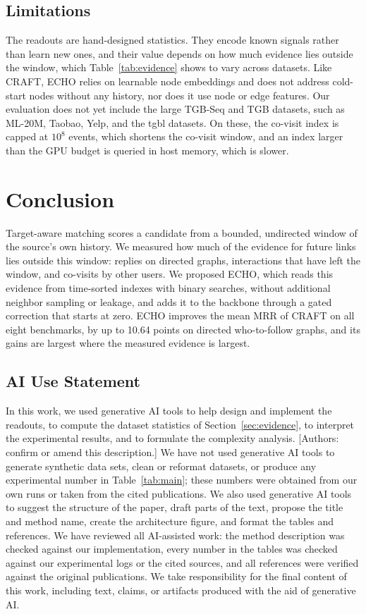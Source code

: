 \documentclass[twoside]{article}
\newcommand{\ours}{ECHO}
\begin{document}
\subsection{Limitations}

The readouts are hand-designed statistics. They encode known signals rather than learn new ones, and their value depends on how much evidence lies outside the window, which Table~\ref{tab:evidence} shows to vary across datasets. Like CRAFT, \ours{} relies on learnable node embeddings and does not address cold-start nodes without any history, nor does it use node or edge features. Our evaluation does not yet include the large TGB-Seq and TGB datasets, such as ML-20M, Taobao, Yelp, and the tgbl datasets. On these, the co-visit index is capped at $10^8$ events, which shortens the co-visit window, and an index larger than the GPU budget is queried in host memory, which is slower.

\section{Conclusion}

Target-aware matching scores a candidate from a bounded, undirected window of the source's own history. We measured how much of the evidence for future links lies outside this window: replies on directed graphs, interactions that have left the window, and co-visits by other users. We proposed \ours{}, which reads this evidence from time-sorted indexes with binary searches, without additional neighbor sampling or leakage, and adds it to the backbone through a gated correction that starts at zero. \ours{} improves the mean MRR of CRAFT on all eight benchmarks, by up to 10.64 points on directed who-to-follow graphs, and its gains are largest where the measured evidence is largest.

\subsection*{AI Use Statement}

In this work, we used generative AI tools to help design and implement the readouts, to compute the dataset statistics of Section~\ref{sec:evidence}, to interpret the experimental results, and to formulate the complexity analysis. [Authors: confirm or amend this description.] We have not used generative AI tools to generate synthetic data sets, clean or reformat datasets, or produce any experimental number in Table~\ref{tab:main}; these numbers were obtained from our own runs or taken from the cited publications. We also used generative AI tools to suggest the structure of the paper, draft parts of the text, propose the title and method name, create the architecture figure, and format the tables and references. We have reviewed all AI-assisted work: the method description was checked against our implementation, every number in the tables was checked against our experimental logs or the cited sources, and all references were verified against the original publications. We take responsibility for the final content of this work, including text, claims, or artifacts produced with the aid of generative AI.
\end{document}
